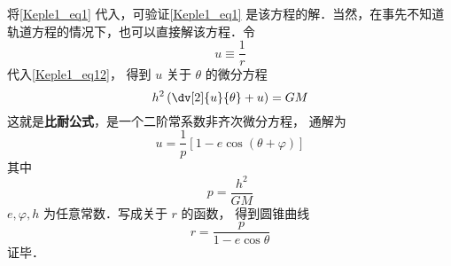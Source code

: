 将\autoref{Keple1_eq1} 代入，可验证\autoref{Keple1_eq1} 是该方程的解．当然，在事先不知道轨道方程的情况下，也可以直接解该方程．令
\begin{equation}\label{Keple1_eq13}
u \equiv \frac{1}{r}
\end{equation}
代入\autoref{Keple1_eq12}，  得到 $u$ 关于 $\theta $ 的微分方程
\begin{equation}\label{Keple1_eq15}
{h^2}\left( \dv[2]{u}{\theta} + u \right) =  GM
\end{equation}
这就是\textbf{比耐公式}，是一个二阶常系数非齐次微分方程，
通解为
\begin{equation}
u = \frac{1}{p} \left[1 - e\cos(\theta  + \varphi)\right]
\end{equation}
其中
\begin{equation}
p = \frac{h^2}{GM}
\end{equation}
$e, \varphi, h$ 为任意常数．写成关于 $r$ 的函数， 得到圆锥曲线
\begin{equation}\label{Keple1_eq16}
r = \frac{p}{{1 - e \cos \theta }}
\end{equation}
证毕．
